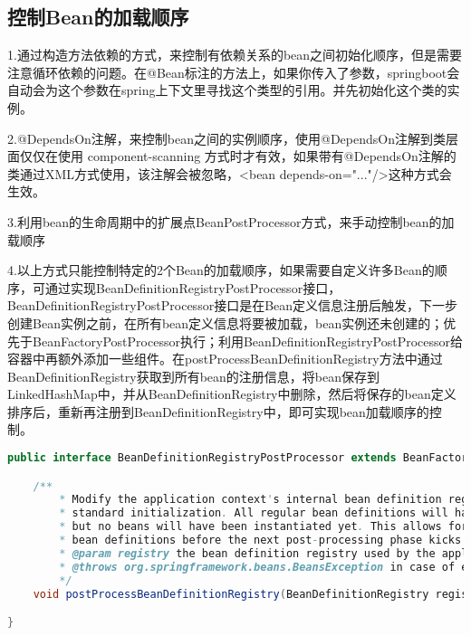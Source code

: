 \documentclass[../../../interview-questions.tex]{subfiles}
\begin{document}
\subsection{控制Bean的加载顺序}

1.通过构造方法依赖的方式，来控制有依赖关系的bean之间初始化顺序，但是需要注意循环依赖的问题。在@Bean标注的方法上，如果你传入了参数，springboot会自动会为这个参数在spring上下文里寻找这个类型的引用。并先初始化这个类的实例。

2.@DependsOn注解，来控制bean之间的实例顺序，使用@DependsOn注解到类层面仅仅在使用 component-scanning 方式时才有效，如果带有@DependsOn注解的类通过XML方式使用，该注解会被忽略，<bean depends-on="..."/>这种方式会生效。

3.利用bean的生命周期中的扩展点BeanPostProcessor方式，来手动控制bean的加载顺序

4.以上方式只能控制特定的2个Bean的加载顺序，如果需要自定义许多Bean的顺序，可通过实现BeanDefinitionRegistryPostProcessor接口，BeanDefinitionRegistryPostProcessor接口是在Bean定义信息注册后触发，下一步创建Bean实例之前，在所有bean定义信息将要被加载，bean实例还未创建的；优先于BeanFactoryPostProcessor执行；利用BeanDefinitionRegistryPostProcessor给容器中再额外添加一些组件。在postProcessBeanDefinitionRegistry方法中通过BeanDefinitionRegistry获取到所有bean的注册信息，将bean保存到LinkedHashMap中，并从BeanDefinitionRegistry中删除，然后将保存的bean定义排序后，重新再注册到BeanDefinitionRegistry中，即可实现bean加载顺序的控制。

\begin{lstlisting}[language=Java]
public interface BeanDefinitionRegistryPostProcessor extends BeanFactoryPostProcessor {

    /**
        * Modify the application context's internal bean definition registry after its
        * standard initialization. All regular bean definitions will have been loaded,
        * but no beans will have been instantiated yet. This allows for adding further
        * bean definitions before the next post-processing phase kicks in.
        * @param registry the bean definition registry used by the application context
        * @throws org.springframework.beans.BeansException in case of errors
        */
    void postProcessBeanDefinitionRegistry(BeanDefinitionRegistry registry) throws BeansException;

}
\end{lstlisting}
\end{document}
